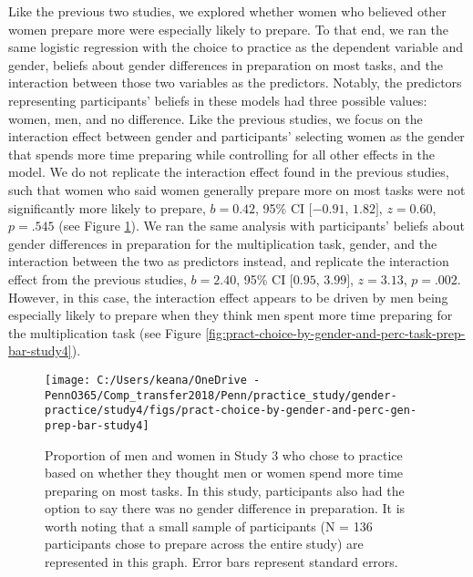 \documentclass[letterpaper, nobind]{templates/ociamthesis}
\begin{document}
Like the previous two studies, we explored whether women who believed other women prepare more were especially likely to prepare. To that end, we ran the same logistic regression with the choice to practice as the dependent variable and gender, beliefs about gender differences in preparation on most tasks, and the interaction between those two variables as the predictors. Notably, the predictors representing participants' beliefs in these models had three possible values: women, men, and no difference. Like the previous studies, we focus on the interaction effect between gender and participants' selecting women as the gender that spends more time preparing while controlling for all other effects in the model. We do not replicate the interaction effect found in the previous studies, such that women who said women generally prepare more on most tasks were not significantly more likely to prepare, \(b = 0.42\), 95\% CI \([-0.91\), \(1.82]\), \(z = 0.60\), \(p = .545\) (see Figure \ref{fig:pract-choice-by-gender-and-perc-gen-prep-bar-study4}). We ran the same analysis with participants' beliefs about gender differences in preparation for the multiplication task, gender, and the interaction between the two as predictors instead, and replicate the interaction effect from the previous studies, \(b = 2.40\), 95\% CI \([0.95\), \(3.99]\), \(z = 3.13\), \(p = .002\). However, in this case, the interaction effect appears to be driven by men being especially likely to prepare when they think men spent more time preparing for the multiplication task (see Figure \ref{fig:pract-choice-by-gender-and-perc-task-prep-bar-study4}).

\begin{figure}

{\centering \texttt{[image: C:/Users/keana/OneDrive - PennO365/Comp\_transfer2018/Penn/practice\_study/gender-practice/study4/figs/pract-choice-by-gender-and-perc-gen-prep-bar-study4]} 

}

\caption{Proportion of men and women in Study 3 who chose to practice based on whether they thought men or women spend more time preparing on most tasks. In this study, participants also had the option to say there was no gender difference in preparation. It is worth noting that a small sample of participants (N = 136 participants chose to prepare across the entire study) are represented in this graph. Error bars represent standard errors.}\label{fig:pract-choice-by-gender-and-perc-gen-prep-bar-study4}
\end{figure}
\end{document}
